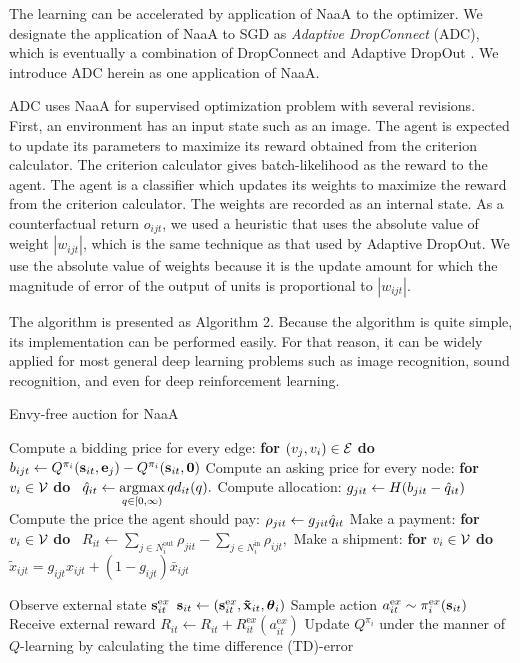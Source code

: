 The learning can be accelerated by application of NaaA to the optimizer.
We designate the application of NaaA to SGD as {\em Adaptive DropConnect} (ADC), 
which is eventually a combination of DropConnect \citep{wan2013regularization} and Adaptive DropOut \citep{ba2013adaptive}.
We introduce ADC herein as one application of NaaA.

ADC uses NaaA for supervised optimization problem with several revisions.
First, an environment has an input state such as an image. The agent is expected to update its parameters to maximize its reward obtained from the criterion calculator.
The criterion calculator gives batch-likelihood as the reward to the agent.
The agent is a classifier which updates its weights to maximize the reward from the criterion calculator.
The weights are recorded as an internal state.
As a counterfactual return $o_{ijt}$, we used a heuristic that uses the absolute value of weight $|w_{ijt}|$, which is the
same technique as that used by Adaptive DropOut.
We use the absolute value of weights because it is the update amount for which the magnitude of error of the output of units is proportional to $|w_{ijt}|$.

The algorithm is presented as Algorithm 2.
Because the algorithm is quite simple, its implementation can be performed easily.
For that reason, it can be widely applied for most general deep learning problems such as 
image recognition, sound recognition, and even for deep reinforcement learning.

\begin{algorithm}[t]
\caption{Envy-free auction for NaaA}
\begin{algorithmic}[1]
		\STATE Compute a bidding price for every edge: \textbf{for} $(v_j, v_i) \in \mathcal{E}$ \textbf{do} \
		$b_{ijt} \leftarrow Q^{\pi_i}( \mathrm{\mathbf{s}}_{it}, \mathrm{\mathbf{e}}_j) - Q^{\pi_i}( \mathrm{\mathbf{s}}_{it}, \mathrm{\mathbf{0}})$ 
		\STATE Compute an asking price for every node: \textbf{for} $\unit \in \units$ \textbf{do} \
		${\hat{q}}_{it} \leftarrow \mathop{\rm argmax}\limits_{q \in [0, \infty)} q d_{it}(q).$
		\FOR{$(v_i, v_j) \in \edges$}
				\STATE Compute allocation: $g_{jit} \leftarrow H(b_{jit} - {\hat{q}}_{it})$ 
				\STATE Compute the price the agent should pay: $\rho_{jit} \leftarrow g_{jit} {\hat{q}}_{it}$ 
		\ENDFOR
		\STATE Make a payment: \textbf{for} $\unit \in \units$ \textbf{do} \
		$R_{it} \leftarrow \sum_{j \in N^\mathrm{out}_i} \rho_{jit} 
				- \sum_{j \in N^\mathrm{in}_i} \rho_{ijt},$
		\STATE Make a shipment: \textbf{for} $\unit \in \units$ \textbf{do} \
		$\tilde{x}_{ijt} = g_{ijt} x_{ijt} + ( 1 - g_{ijt} ) \bar{x}_{ijt} $

		\FOR{$\unit \in \units$} 
			\STATE Observe external state $\mathrm{\mathbf{s}}_{it}^{\mathrm ex}$
			\STATE $\mathrm{\mathbf{s}}_{it} \leftarrow (\mathrm{\mathbf{s}}_{it}^{\mathrm ex}, \mathrm{\mathbf{\tilde{x}}}_{it}, \boldsymbol{\theta}_i)$
			\STATE Sample action $a_{it}^{\mathrm ex} \sim \pi_i^{\mathrm ex}(\mathrm{\mathbf{s}}_{it})$
			\STATE Receive external reward $R_{it} \leftarrow R_{it} + R_{it}^{\mathrm ex}(a_{it}^{\mathrm ex})$
			\STATE Update $Q^{\pi_i}$ under the manner of $Q$-learning by calculating the time difference (TD)-error 
		\ENDFOR
	\ENDFOR
\end{algorithmic}
\end{algorithm}

